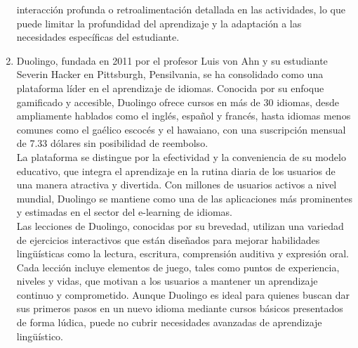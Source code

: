 \documentclass[
]{article}
\begin{document}
\begin{enumerate}
  interacción profunda o retroalimentación detallada en las actividades,
  lo que puede limitar la profundidad del aprendizaje y la adaptación a
  las necesidades específicas del estudiante.
\item
  Duolingo, fundada en 2011 por el profesor Luis von Ahn y su estudiante
  Severin Hacker en Pittsburgh, Pensilvania, se ha consolidado como una
  plataforma líder en el aprendizaje de idiomas. Conocida por su enfoque
  gamificado y accesible, Duolingo ofrece cursos en más de 30 idiomas,
  desde ampliamente hablados como el inglés, español y francés, hasta
  idiomas menos comunes como el gaélico escocés y el hawaiano, con una
  suscripción mensual de 7.33 dólares sin posibilidad de reembolso.\\
  La plataforma se distingue por la efectividad y la conveniencia de su
  modelo educativo, que integra el aprendizaje en la rutina diaria de
  los usuarios de una manera atractiva y divertida. Con millones de
  usuarios activos a nivel mundial, Duolingo se mantiene como una de las
  aplicaciones más prominentes y estimadas en el sector del e-learning
  de idiomas.\\
  Las lecciones de Duolingo, conocidas por su brevedad, utilizan una
  variedad de ejercicios interactivos que están diseñados para mejorar
  habilidades lingüísticas como la lectura, escritura, comprensión
  auditiva y expresión oral. Cada lección incluye elementos de juego,
  tales como puntos de experiencia, niveles y vidas, que motivan a los
  usuarios a mantener un aprendizaje continuo y comprometido. Aunque
  Duolingo es ideal para quienes buscan dar sus primeros pasos en un
  nuevo idioma mediante cursos básicos presentados de forma lúdica,
  puede no cubrir necesidades avanzadas de aprendizaje lingüístico.
\end{enumerate}
\end{document}
